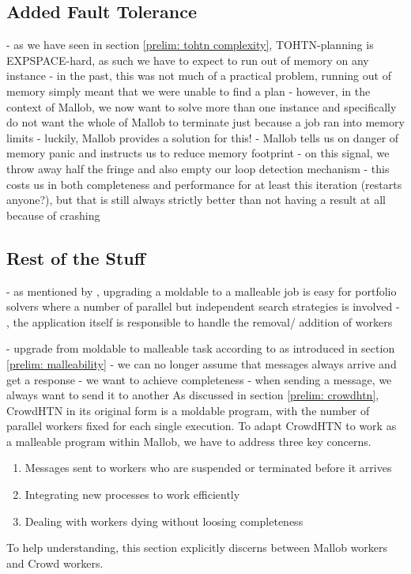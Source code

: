 \subsection{Added Fault Tolerance}
- as we have seen in section \ref{prelim: tohtn complexity}, TOHTN-planning is EXPSPACE-hard, as such we have to expect to run out of memory on any instance
- in the past, this was not much of a practical problem, running out of memory simply meant that we were unable to find a plan
- however, in the context of Mallob, we now want to solve more than one instance and specifically do not want the whole of Mallob to terminate just because a job ran into memory limits
- luckily, Mallob provides a solution for this!
- Mallob tells us on danger of memory panic and instructs us to reduce memory footprint
- on this signal, we throw away half the fringe and also empty our loop detection mechanism
- this costs us in both completeness and performance for at least this iteration (restarts anyone?), but that is still always strictly better than not having a result at all because of crashing

\subsection{Rest of the Stuff}

- as mentioned by \cite{sanders2022decentralized}, upgrading a moldable to a malleable job is easy for portfolio solvers where a number of parallel but independent search strategies is involved
- \cite{sanders2022decentralized}, the application itself is responsible to handle the removal/ addition of workers

- upgrade from moldable to malleable task according to \cite{feitelson1997job} as introduced in section \ref{prelim: malleability}
- we can no longer assume that messages always arrive and get a response
- we want to achieve completeness
- when sending a message, we always want to send it to another 
As discussed in section \ref{prelim: crowdhtn}, CrowdHTN in its original form is a moldable program, with the number of parallel workers fixed for each single execution. To adapt CrowdHTN to work as a malleable program within Mallob, we have to address three key concerns.
\begin{enumerate}
	\item Messages sent to workers who are suspended or terminated before it arrives
	\item Integrating new processes to work efficiently
	\item Dealing with workers dying without loosing completeness
\end{enumerate}
To help understanding, this section explicitly discerns between Mallob workers and Crowd workers. 
